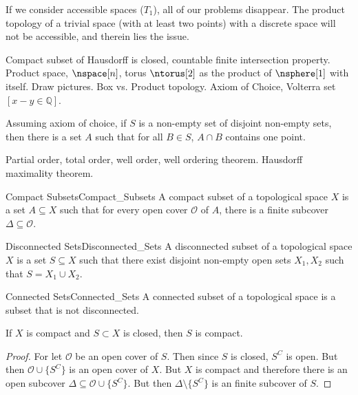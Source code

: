     If we consider accessible spaces ($T_{1}$), all of our problems
    disappear. The product topology of a trivial space (with at least two
    points) with a discrete space will not be accessible, and therein lies
    the issue.
    \par\hfill\par
    Compact subset of Hausdorff is closed, countable finite intersection
    property. Product space, $\nspace[n]$, torus $\ntorus[2]$ as the product
    of $\nsphere[1]$ with itself. Draw pictures. Box vs. Product topology.
    Axiom of Choice, Volterra set $[x-y\in\mathbb{Q}]$.
    \begin{theorem}
        Assuming axiom of choice, if $S$ is a non-empty set of disjoint
        non-empty sets, then there is a set $A$ such that for all
        $B\in{S}$, $A\cap{B}$ contains one point.
    \end{theorem}
    Partial order, total order, well order, well ordering theorem. Hausdorff
    maximality theorem.
    \begin{ldefinition}{Compact Subsets}{Compact_Subsets}
        A compact subset of a topological space $X$ is a set $A\subseteq{X}$
        such that for every open cover $\mathcal{O}$ of $A$, there is a
        finite subcover $\Delta\subseteq\mathcal{O}$.
    \end{ldefinition}
    \begin{ldefinition}{Disconnected Sets}{Disconnected_Sets}
        A disconnected subset of a topological space $X$ is a set
        $S\subseteq{X}$ such that there exist disjoint non-empty open
        sets $X_{1},X_{2}$ such that $S=X_{1}\cup{X_{2}}$.
    \end{ldefinition}
    \begin{ldefinition}{Connected Sets}{Connected_Sets}
        A connected subset of a topological space
        is a subset that is not disconnected.
    \end{ldefinition}
    \begin{theorem}
        If $X$ is compact and $S\subset{X}$ is closed, then $S$ is compact.
    \end{theorem}
    \begin{proof}
        For let $\mathcal{O}$ be an open cover of $S$. Then since $S$ is
        closed, $S^{C}$ is open. But then $\mathcal{O}\cup\{S^{C}\}$ is
        an open cover of $X$. But $X$ is compact and therefore there is
        an open subcover $\Delta\subseteq\mathcal{O}\cup\{S^{C}\}$. But
        then $\Delta\setminus\{S^{C}\}$ is an finite subcover of $S$.
    \end{proof}
